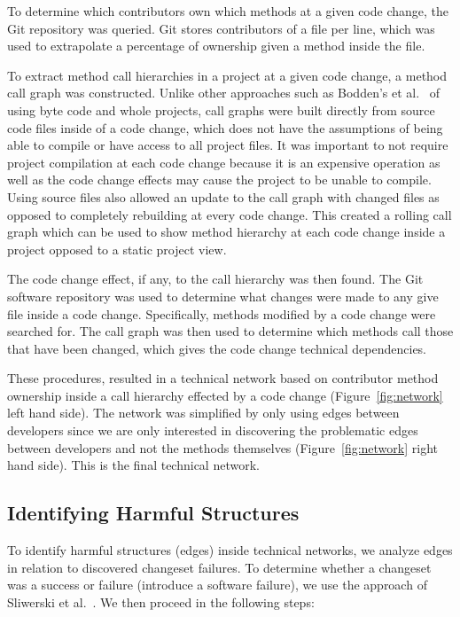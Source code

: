 \documentclass[conference]{IEEEtran}
\begin{document}
To determine which contributors own which methods at a given code change,
the Git repository was queried. Git stores contributors of a file per line, which was used to extrapolate
a percentage of ownership given a method inside the file.

To extract method call hierarchies in a project at a given code change,
a method call graph was constructed. Unlike other approaches such as Bodden's et al.~\cite{Bodden:2003:HVJ} 
of using byte code and whole projects, call graphs were built directly from source code files
inside of a code change, 
which does not have the assumptions of being able to compile or have access to all project 
files. It was important to not require project compilation at each code change because it is
an expensive operation as well as the code change effects may cause the project
to be unable to compile. Using source files also allowed an update to the call graph
with changed files as opposed to completely rebuilding at 
every code change. This created a rolling call graph which 
can be used to show method hierarchy at each code change inside a project opposed to
a static project view.

The code change effect, if any, to the call hierarchy was then found. The Git
software repository was used to determine what changes were made to any give file inside a 
code change. Specifically, methods modified by a code change were searched for. The call graph 
was then used to determine which methods call those that have been changed, which
gives the code change technical dependencies.

These procedures, resulted in a technical network based on contributor method ownership 
inside a call hierarchy effected by a code change (Figure~\ref{fig:network} left hand side).
The network was simplified by only using edges between developers since we 
are only interested in discovering the problematic edges between developers and not the 
methods themselves (Figure~\ref{fig:network} right hand side). This is the final technical 
network.

\subsection{Identifying Harmful Structures}
To identify harmful structures (edges) inside technical networks, we analyze 
edges in relation to discovered changeset failures. To determine whether a changeset 
was a success or failure (introduce a software failure), we use the approach of
Sliwerski et al.~\cite{Sliwerski:2005:CIF}. We then proceed in the following steps:
\end{document}
